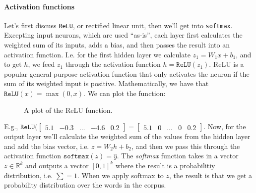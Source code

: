 \documentclass[12pt]{article}
\begin{document}
\paragraph{Activation functions} Let's first discuss \texttt{ReLU}, or rectified linear unit, then we'll get into \texttt{softmax}. Excepting input neurons, which are used ``as-is'', each layer first calculates the weighted sum of its inputs, adds a bias, and then passes the result into an activation function. I.e. for the first hidden layer we calculate $z_1 = W_1 x + b_1$, and to get $h$, we feed $z_1$ through the activation function $h = \texttt{ReLU}(z_1)$. ReLU is a popular general purpose activation function that only activates the neuron if the sum of its weighted input is positive. Mathematically, we have that $\texttt{ReLU}(x) = \max(0, x)$. We can plot the function:


\begin{figure}[h]
  \centering   
  \caption{A plot of the ReLU function.}
\end{figure}

E.g., $\texttt{ReLU}(\begin{bmatrix} 5.1 & -0.3 & \ldots & -4.6 & 0.2 \end{bmatrix} = \begin{bmatrix} 5.1 & 0 & \ldots & 0 & 0.2 \end{bmatrix}$. Now, for the output layer we'll calculate the weighted sum of the values from the hidden layer and add the bias vector, i.e. $z = W_2 h + b_2$, and then we pass this through the activation function $\texttt{softmax}(z) = \hat y$. The \emph{softmax} function takes in a vector $z \in \mathbb R^k$ and outputs a vector $[0,1]^k$ where the result is a probabilitiy distribution, i.e. $\sum = 1$. When we apply softmax to $z$, the result is that we get a probability distribution over the words in the corpus.
\end{document}
